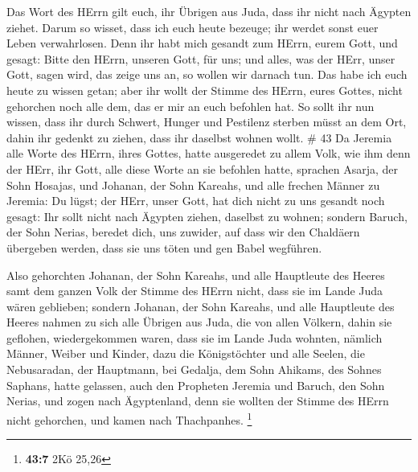  Das Wort des HErrn gilt euch, ihr Übrigen aus Juda, dass
ihr nicht nach Ägypten ziehet. Darum so wisset, dass ich euch heute
bezeuge;  ihr werdet sonst euer Leben verwahrlosen. Denn
ihr habt mich gesandt zum HErrn, eurem Gott, und gesagt: Bitte den
HErrn, unseren Gott, für uns; und alles, was der HErr, unser Gott, sagen
wird, das zeige uns an, so wollen wir darnach tun.  Das
habe ich euch heute zu wissen getan; aber ihr wollt der Stimme des
HErrn, eures Gottes, nicht gehorchen noch alle dem, das er mir an euch
befohlen hat.  So sollt ihr nun wissen, dass ihr durch
Schwert, Hunger und Pestilenz sterben müsst an dem Ort, dahin ihr
gedenkt zu ziehen, dass ihr daselbst wohnen wollt. \# 43  Da
Jeremia alle Worte des HErrn, ihres Gottes, hatte ausgeredet zu allem
Volk, wie ihm denn der HErr, ihr Gott, alle diese Worte an sie befohlen
hatte,  sprachen Asarja, der Sohn Hosajas, und Johanan, der
Sohn Kareahs, und alle frechen Männer zu Jeremia: Du lügst; der HErr,
unser Gott, hat dich nicht zu uns gesandt noch gesagt: Ihr sollt nicht
nach Ägypten ziehen, daselbst zu wohnen;  sondern Baruch,
der Sohn Nerias, beredet dich, uns zuwider, auf dass wir den Chaldäern
übergeben werden, dass sie uns töten und gen Babel wegführen.

 Also gehorchten Johanan, der Sohn Kareahs, und alle
Hauptleute des Heeres samt dem ganzen Volk der Stimme des HErrn nicht,
dass sie im Lande Juda wären geblieben;  sondern Johanan,
der Sohn Kareahs, und alle Hauptleute des Heeres nahmen zu sich alle
Übrigen aus Juda, die von allen Völkern, dahin sie geflohen,
wiedergekommen waren, dass sie im Lande Juda wohnten, 
nämlich Männer, Weiber und Kinder, dazu die Königstöchter und alle
Seelen, die Nebusaradan, der Hauptmann, bei Gedalja, dem Sohn Ahikams,
des Sohnes Saphans, hatte gelassen, auch den Propheten Jeremia und
Baruch, den Sohn Nerias,  und zogen nach Ägyptenland, denn
sie wollten der Stimme des HErrn nicht gehorchen, und kamen nach
Thachpanhes. \footnote{\textbf{43:7} 2Kö 25,26}

